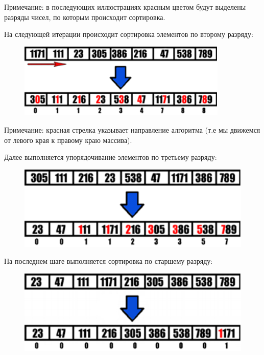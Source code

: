 \documentclass{report}
\begin{document}
Примечание: в последующих иллюстрациях красным цветом будут выделены разряды чисел, по которым происходит сортировка.


На следующей итерации происходит сортировка элементов по второму разряду:

\begin{figure}[htp]
    \centering
    \includegraphics[width=10cm]{image3}
    \label{fig:galaxy}
\end{figure}
\newpage
Примечание: красная стрелка указывает направление алгоритма (т.е мы движемся от левого края к правому краю массива).

Далее выполняется упорядочивание элементов по третьему разряду:

\begin{figure}[htp]
    \centering
    \includegraphics[width=14cm]{image4}
    \label{fig:galaxy}
\end{figure}

На последнем шаге выполняется сортировка по старшему разряду:

\begin{figure}[htp]
    \centering
    \includegraphics[width=14cm]{image5}
    \label{fig:galaxy}
\end{figure}
\end{document}
